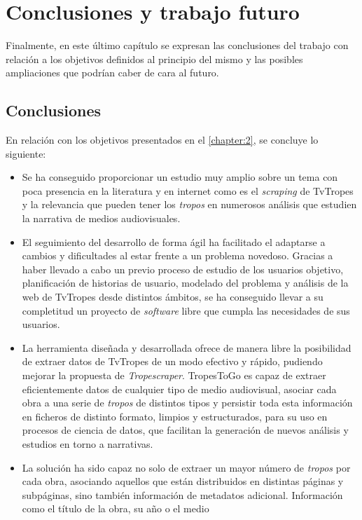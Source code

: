 \chapter{Conclusiones y trabajo futuro}
Finalmente, en este último capítulo se expresan las conclusiones del trabajo con
relación a los objetivos definidos al principio del mismo y las posibles
ampliaciones que podrían caber de cara al futuro.

\section{Conclusiones}
En relación con los objetivos presentados en el \autoref{chapter:2}, se concluye
lo siguiente:
\begin{itemize}
    \item Se ha conseguido proporcionar un estudio muy amplio sobre un tema con
    poca presencia en la literatura y en internet como es el \textit{scraping}
    de TvTropes y la relevancia que pueden tener los \textit{tropos} en
    numerosos análisis que estudien la narrativa de medios audiovisuales. 
    \item El seguimiento del desarrollo de forma ágil ha facilitado el adaptarse
    a cambios y dificultades al estar frente a un problema novedoso. Gracias a
    haber llevado a cabo un previo proceso de estudio de los usuarios objetivo,
    planificación de historias de usuario, modelado del problema y análisis de
    la web de TvTropes desde distintos ámbitos, se ha conseguido llevar a su
    completitud un proyecto de \textit{software} libre que cumpla las
    necesidades de sus usuarios.
    \item La herramienta diseñada y desarrollada ofrece de manera libre la
    posibilidad de extraer datos de TvTropes de un modo efectivo y rápido,
    pudiendo mejorar la propuesta de \textit{Tropescraper}. TropesToGo es capaz
    de extraer eficientemente datos de cualquier tipo de medio audiovisual,
    asociar cada obra a una serie de \textit{tropos} de distintos tipos y
    persistir toda esta información en ficheros de distinto formato, limpios y
    estructurados, para su uso en procesos de ciencia de datos, que facilitan la
    generación de nuevos análisis y estudios en torno a narrativas.
    \item La solución ha sido capaz no solo de extraer un mayor número de
    \textit{tropos} por cada obra, asociando aquellos que están distribuidos en
    distintas páginas y subpáginas, sino también información de metadatos
    adicional. Información como el título de la obra, su año o el medio

\end{itemize}
